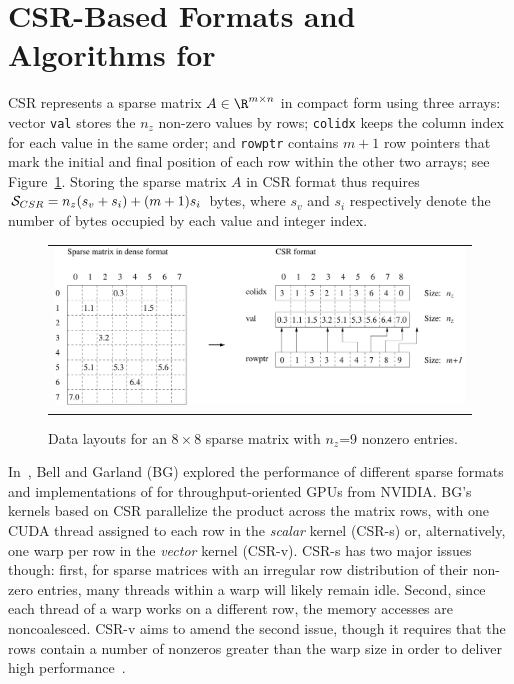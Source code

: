 \section{CSR-Based Formats and Algorithms for \spmv}
\label{2017-csr-spmv:sec:spmv}


CSR represents a sparse matrix $A \in \R^{m \times n}$ in compact form
using three arrays:
vector {\tt val} stores the $n_z$ non-zero values by rows;
{\tt colidx} keeps the column index for each value in the same order;
and {\tt rowptr} contains $m+1$ row pointers that mark the initial
and final position of each row within the other two arrays;
see Figure~\ref{2017-csr-spmv:fig:spmv}.
Storing the sparse matrix $A$ in CSR format thus requires ${\cal S}_{CSR} = n_z(s_v+s_i)+(m+1)s_i$ bytes, where
$s_v$ and $s_i$ respectively denote the number of bytes occupied 
by each value and integer index.

\begin{figure}[t]
\begin{tabular}{c}
\begin{minipage}{\textwidth}
\begin{center}
\includegraphics[width=\textwidth]{plots/csr_format}
\end{center}
\end{minipage}
\end{tabular}
\caption{Data layouts
for an $8 \times 8$ sparse matrix with $n_z$=9 nonzero entries.}
\label{2017-csr-spmv:fig:spmv}
\end{figure}

In~\cite{Bell:SpMV:NVIDIA:2008}, Bell and Garland (BG) explored the performance
of different sparse formats and implementations of \spmv for throughput-oriented GPUs from NVIDIA.
BG's \spmv kernels based on CSR
parallelize the product
across the matrix rows,
with one CUDA thread assigned to each row in the {\em scalar} kernel (CSR-s) or,
alternatively, one warp per row in the {\em vector} kernel (CSR-v).
CSR-s has two major issues though: first, for sparse matrices with an
irregular row distribution of their non-zero entries,
many threads within a warp will likely remain idle.
Second, since each thread of a warp works on a different row,
the memory accesses are noncoalesced.
CSR-v aims to amend the second issue,
though it
requires that the rows contain a number of nonzeros greater than the warp
size in order to deliver high performance~\cite{Bell:SpMV:NVIDIA:2008}.

